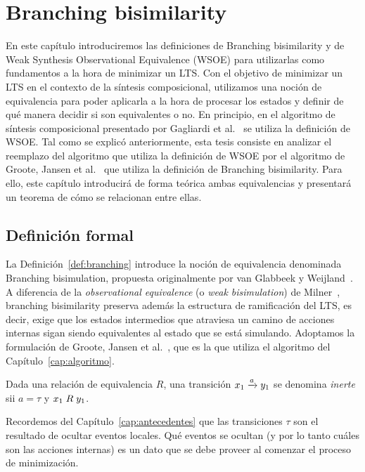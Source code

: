 \chapter{Branching bisimilarity}
\label{cap:equivalencias}

En este capítulo introduciremos las definiciones de Branching bisimilarity y de Weak Synthesis Observational Equivalence (WSOE) para utilizarlas como fundamentos a la hora de minimizar un LTS. Con el objetivo de minimizar un LTS en el contexto de la síntesis composicional, utilizamos una noción de equivalencia para poder aplicarla a la hora de procesar los estados y definir de qué manera decidir si son equivalentes o no. En principio, en el algoritmo de síntesis composicional presentado por Gagliardi et al.~\cite{compositional} se utiliza la definición de WSOE. Tal como se explicó anteriormente, esta tesis consiste en analizar el reemplazo del algoritmo que utiliza la definición de WSOE por el algoritmo de Groote, Jansen et al.~\cite{groote2019} que utiliza la definición de Branching bisimilarity. Para ello, este capítulo introducirá de forma teórica ambas equivalencias y presentará un teorema de cómo se relacionan entre ellas.

\section{Definición formal}
\label{sec:def-branching}
La Definición~\ref{def:branching} introduce la noción de equivalencia denominada Branching bisimulation, propuesta originalmente por van Glabbeek y Weijland~\cite{glabbeek1996}. A diferencia de la \textit{observational equivalence} (o \textit{weak bisimulation}) de Milner~\cite{milner1989}, branching bisimilarity preserva además la estructura de ramificación del LTS, es decir, exige que los estados intermedios que atraviesa un camino de acciones internas sigan siendo equivalentes al estado que se está simulando. Adoptamos la formulación de Groote, Jansen et al.~\cite{groote2019}, que es la que utiliza el algoritmo del Capítulo~\ref{cap:algoritmo}.

Dada una relación de equivalencia $R$, una transición $x_1\pijl{a}y_1$ se denomina \textit{inerte} sii $a = \tau$ y  ${x_1 \mathrel{R} y_1}$.

Recordemos del Capítulo~\ref{cap:antecedentes} que las transiciones $\tau$ son el resultado de ocultar eventos locales. Qué eventos se ocultan (y por lo tanto cuáles son las acciones internas) es un dato que se debe proveer al comenzar el proceso de minimización.

